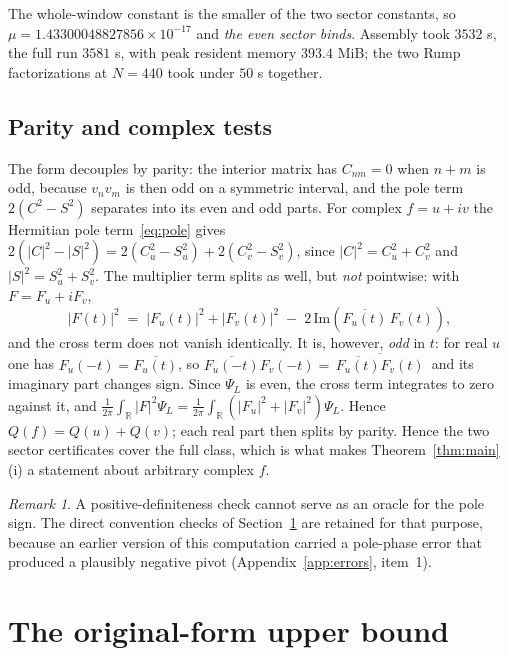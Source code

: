 \documentclass[11pt,a4paper]{article}
\theoremstyle{definition}
\theoremstyle{remark}
\newtheorem{remark}[theorem]{Remark}
\newcommand{\PsiL}{\Psi_{L}}
\begin{document}
The whole-window constant is the smaller of the two sector constants, so
$\mu = 1.43300048827856\times10^{-17}$ and \emph{the even sector binds}. Assembly took
$3532$ s, the full run $3581$ s, with peak resident memory $393.4$ MiB; the two
Rump factorizations at $N = 440$ took under $50$ s together.

\subsection{Parity and complex tests}
\label{sec:parity-complex}

The form decouples by parity: the interior matrix has $C_{nm} = 0$ when $n+m$ is
odd, because $v_nv_m$ is then odd on a symmetric interval, and the pole term
$2(C^2 - S^2)$ separates into its even and odd parts. For complex $f = u + iv$
the Hermitian pole term~\eqref{eq:pole} gives
$2(|C|^2 - |S|^2) = 2(C_u^2 - S_u^2) + 2(C_v^2 - S_v^2)$, since
$|C|^2 = C_u^2 + C_v^2$ and $|S|^2 = S_u^2 + S_v^2$. The multiplier term splits
as well, but \emph{not} pointwise: with $F = F_u + iF_v$,
\[
   |F(t)|^2 \;=\; |F_u(t)|^2 + |F_v(t)|^2
               \;-\; 2\,\mathrm{Im}\!\left(\overline{F_u(t)}\,F_v(t)\right) ,
\]
and the cross term does not vanish identically. It is, however, \emph{odd} in
$t$: for real $u$ one has $F_u(-t) = \overline{F_u(t)}$, so
$\overline{F_u(-t)}F_v(-t) = \overline{\,\overline{F_u(t)}F_v(t)\,}$ and its
imaginary part changes sign. Since $\PsiL$ is even, the cross term integrates to
zero against it, and
$\frac{1}{2\pi}\int_{\mathbb{R}}|F|^2\PsiL
 = \frac{1}{2\pi}\int_{\mathbb{R}}(|F_u|^2 + |F_v|^2)\PsiL$. Hence
$Q(f) = Q(u) + Q(v)$; each real part then splits by parity. Hence the two sector certificates cover the full class, which is what
makes Theorem~\ref{thm:main}(i) a statement about arbitrary complex $f$.

\begin{remark}
A positive-definiteness check cannot serve as an oracle for the pole sign. The
direct convention checks of Section~\ref{sec:upper} are retained for that
purpose, because an earlier version of this computation carried a pole-phase
error that produced a plausibly negative pivot
(Appendix~\ref{app:errors}, item~1).
\end{remark}

\section{The original-form upper bound}
\label{sec:upper}
\end{document}
